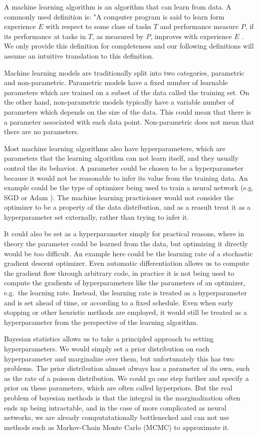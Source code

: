 A machine learning algorithm is an algorithm that can learn from data. A
commonly used definition is: "A computer program is said to learn form
experience $E$ with respect to some class of tasks $T$ and performance measure
$P$, if its performance at tasks in $T$, as measured by $P$, improves with
experience $E$ \citep{mitchell-mldef}. We only provide this definition for
completeness and our following definitions will assume an intuitive translation
to this definition.

Machine learning models are traditionally split into two categories, parametric
and non-parametric. Parametric models have a fixed number of learnable parameters
which are trained on a subset of the data called the training set. On the other hand,
non-parametric models typically have a variable number of parameters which depends on
the size of the data. This could mean that there is a parameter associated with each
data point. Non-parametric does not mean that there are no parameters.

Most machine learning algorithms also have hyperparameters, which are
parameters that the learning algorithm can not learn itself, and they usually
control the its behavior. A parameter could be chosen to be a hyperparameter
because it would not be reasonable to infer its value from the training data.
An example could be the type of optimizer being used to train a neural network
(e.g. SGD or Adam \citep{kingma2014adam}). The machine learning practicioner
would not consider the optimizer to be a property of the data distribution, and
as a reasult treat it as a hyperparameter set externally, rather than trying to
infer it.

It could also be set as a hyperparameter simply for practical reasons, where in
theory the parameter could be learned from the data, but optimizing it directly
would be too difficult. An example here could be the learning rate of a
stochastic gradient descent optimizer. Even automatic differentiation
\citep{maclaurin2015autograd} allows us to compute the gradient flow through
arbitrary code, in practice it is not being used to compute the gradients of
hyperparameters like the parameters of an optimizer, e.g.\ the learning rate.
Instead, the learning rate is treated as a hyperparameter and is set ahead of
time, or according to a fixed schedule. Even when early stopping or other
heuristic methods are employed, it would still be treated as a hyperparameter
from the perspective of the learning algorithm.

Bayesian statistics allows us to take a principled approach to setting
hyperparameters. We would simply set a prior distribution on each
hyperparameter and marginalize over them, but unfortunately this has two
problems. The prior distribution almost always has a parameter of its own, such
as the rate of a poisson distribution. We could go one step further and specify
a prior on these parameters, which are often called hyperpriors.  But the real
problem of bayesian methods is that the integral in the marginalization often
ends up being intractable, and in the case of more complicated as neural
networks, we are already computatationally bottlenecked and can not use methods
such as Markov-Chain Monte Carlo (MCMC) to approximate it.


